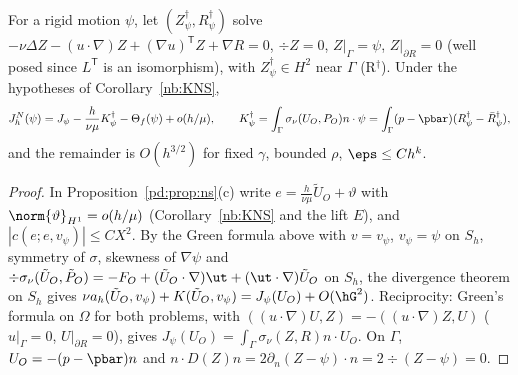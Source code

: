 \begin{corollary}
For a rigid motion $\psi$, let $(Z^\dagger_\psi,R^\dagger_\psi)$ solve $-\nu\Delta Z-(u\cdot\nabla)Z+(\nabla u)^{\mathsf T}Z+\nabla R=0$, $\div Z=0$, $Z|_\Gamma=\psi$, $Z|_{\partial R}=0$
(well posed since $L^{\mathsf T}$ is an isomorphism), with $Z^\dagger_\psi\in H^2$ near $\Gamma$ (R$^\dagger$). Under the hypotheses of Corollary~\ref{nb:KNS},
\[
J^N_h(\psi)=J_\psi-\frac h{\nu\mu}K^\dagger_\psi-\Theta_f(\psi)+o(h/\mu),\qquad K^\dagger_\psi=\int_\Gamma\sigma_\nu(U_O,P_O)n\cdot\psi=\int_\Gamma(p-\pbar)(R^\dagger_\psi-\bar R^\dagger_\psi),
\]
and the remainder is $O(h^{3/2})$ for fixed $\gamma$, bounded $\rho$, $\eps\le Ch^k$.
\end{corollary}
\begin{proof}
In Proposition~\ref{pd:prop:ns}(c) write $e=\frac h{\nu\mu}\tilde U_O+\vartheta$ with $\norm{\vartheta}_{H^1}=o(h/\mu)$ (Corollary~\ref{nb:KNS} and the lift $E$), and $|c(e;e,v_\psi)|\le CX^2$.
By the Green formula above with $v=v_\psi$, $v_\psi=\psi$ on $S_h$, symmetry of $\sigma$, skewness of $\nabla\psi$ and $\div\sigma_\nu(\tilde U_O,\tilde P_O)=-F_O+(\tilde U_O\cdot\nabla)\ut+(\ut\cdot\nabla)\tilde U_O$ on $S_h$,
the divergence theorem on $S_h$ gives $\nu a_h(\tilde U_O,v_\psi)+K(\tilde U_O,v_\psi)=J_\psi(U_O)+O(\hG^2)$.
Reciprocity: Green's formula on $\Omega$ for both problems, with $((u\cdot\nabla)U,Z)=-((u\cdot\nabla)Z,U)$ ($u|_\Gamma=0$, $U|_{\partial R}=0$), gives
$J_\psi(U_O)=\int_\Gamma\sigma_\nu(Z,R)n\cdot U_O$. On $\Gamma$, $U_O=-(p-\pbar)n$ and $n\cdot D(Z)n=2\partial_n(Z-\psi)\cdot n=2\div(Z-\psi)=0$.
\end{proof}

